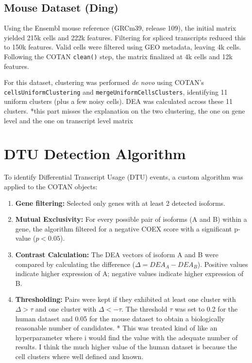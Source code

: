 \subsection{Mouse Dataset (Ding)}
Using the Ensembl mouse reference (GRCm39, release 109), the initial matrix yielded 215k cells and 222k features. Filtering for spliced transcripts reduced this to 150k features. Valid cells were filtered using GEO metadata, leaving 4k cells. Following the COTAN \texttt{clean()} step, the matrix finalized at 4k cells and 12k features. 

For this dataset, clustering was performed \textit{de novo} using COTAN's \texttt{cellsUniformClustering} and \texttt{mergeUniformCellsClusters}, identifying 11 uniform clusters (plus a few noisy cells). DEA was calculated across these 11 clusters. *this part misses the explanation on the two clustering, the one on gene level and the one on transcript level matrix

\section{DTU Detection Algorithm}
To identify Differential Transcript Usage (DTU) events, a custom algorithm was applied to the COTAN objects:
\begin{enumerate}
    \item \textbf{Gene filtering:} Selected only genes with at least 2 detected isoforms.
    \item \textbf{Mutual Exclusivity:} For every possible pair of isoforms (A and B) within a gene, the algorithm filtered for a negative COEX score with a significant p-value ($p < 0.05$).
    \item \textbf{Contrast Calculation:} The DEA vectors of isoform A and B were compared by calculating the difference ($\Delta = DEA_A - DEA_B$). Positive values indicate higher expression of A; negative values indicate higher expression of B.
    \item \textbf{Thresholding:} Pairs were kept if they exhibited at least one cluster with $\Delta > \tau$ and one cluster with $\Delta < -\tau$. The threshold $\tau$ was set to 0.2 for the human dataset and 0.05 for the mouse dataset to obtain a biologically reasonable number of candidates. * This was treated kind of like an hyperparameter where i would find the value with the adequate number of results. I think the much higher value of the human dataset is because the cell clusters where well defined and known.
\end{enumerate}


